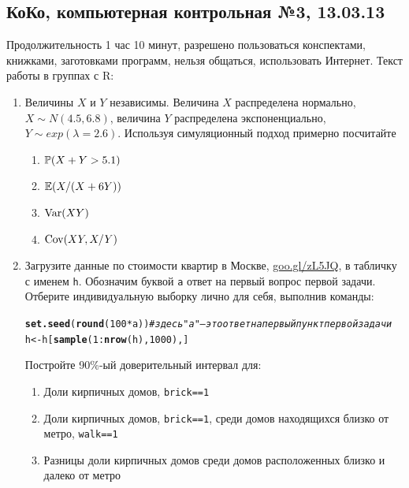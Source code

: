 \documentclass[12pt, a4paper]{article}\usepackage[]{graphicx}\usepackage[]{color}
\makeatletter
\newcommand{\hlnum}[1]{\textcolor[rgb]{0.686,0.059,0.569}{#1}}%
\newcommand{\hlcom}[1]{\textcolor[rgb]{0.678,0.584,0.686}{\textit{#1}}}%
\newcommand{\hlopt}[1]{\textcolor[rgb]{0,0,0}{#1}}%
\newcommand{\hlstd}[1]{\textcolor[rgb]{0.345,0.345,0.345}{#1}}%
\newcommand{\hlkwb}[1]{\textcolor[rgb]{0.69,0.353,0.396}{#1}}%
\newcommand{\hlkwd}[1]{\textcolor[rgb]{0.737,0.353,0.396}{\textbf{#1}}}%
\newenvironment{kframe}{%
 \def\at@end@of@kframe{}%
 \ifinner\ifhmode%
  \def\at@end@of@kframe{\end{minipage}}%
  \begin{minipage}{\columnwidth}%
 \fi\fi%
 \def\FrameCommand##1{\hskip\@totalleftmargin \hskip-\fboxsep
 \colorbox{shadecolor}{##1}\hskip-\fboxsep
     \hskip-\linewidth \hskip-\@totalleftmargin \hskip\columnwidth}%
 \MakeFramed {\advance\hsize-\width
   \@totalleftmargin\z@ \linewidth\hsize
   \@setminipage}}%
 {\par\unskip\endMakeFramed%
 \at@end@of@kframe}
\newenvironment{knitrout}{}{} %
\makeatother
\begin{document}
\subsection{КоКо, компьютерная контрольная №3, 13.03.13}

Продолжительность 1 час 10 минут, разрешено пользоваться конспектами, книжками, заготовками программ, нельзя общаться, использовать Интернет. Текст работы в группах с R:

\begin{enumerate}
\item Величины $X$ и $Y$ независимы. Величина $X$ распределена нормально, $X\sim N(4.5,6.8)$, величина $Y$ распределена экспоненциально, $Y\sim exp(\lambda=2.6)$. Используя симуляционный подход примерно посчитайте

\begin{enumerate}
\item $\P(X+Y>5.1)$
\item $\E(X/(X+6Y))$
\item $\Var(XY)$
\item $\Cov(XY,X/Y)$
\end{enumerate}

\item Загрузите данные по стоимости квартир в Москве, \href{http://goo.gl/zL5JQ}{goo.gl/zL5JQ}, в табличку с именем \verb|h|. Обозначим буквой \verb|a| ответ на первый вопрос первой задачи. Отберите индивидуальную выборку лично для себя, выполнив команды:
\begin{knitrout}
\color{fgcolor}\begin{kframe}
\begin{alltt}
\hlkwd{set.seed}\hlstd{(}\hlkwd{round}\hlstd{(}\hlnum{100} \hlopt{*} \hlstd{a))} \hlcom{# здесь "a" — это ответ на первый пункт первой задачи}
\hlstd{h} \hlkwb{<-} \hlstd{h[}\hlkwd{sample}\hlstd{(}\hlnum{1}\hlopt{:}\hlkwd{nrow}\hlstd{(h),} \hlnum{1000}\hlstd{), ]}
\end{alltt}
\end{kframe}
\end{knitrout}

Постройте 90\%-ый доверительный интервал для:
\begin{enumerate}
\item Доли кирпичных домов, \verb|brick==1|
\item Доли кирпичных домов, \verb|brick==1|, среди домов находящихся близко от метро,  \verb|walk==1|
\item Разницы доли кирпичных домов среди домов расположенных близко и далеко от метро
\end{enumerate}



\end{enumerate}
\end{document}

